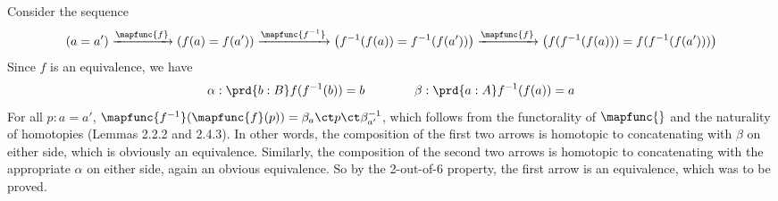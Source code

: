 Consider the sequence
\[
   \left(a = a'\right) \xrightarrow{\mapfunc{f}} 
   \left(f(a) = f(a')\right) \xrightarrow{\mapfunc{f^{-1}}} 
   \left(f^{-1}(f(a)) = f^{-1}(f(a'))\right) \xrightarrow{\mapfunc{f}} 
   \left(f(f^{-1}(f(a))) = f(f^{-1}(f(a')))\right)
\]
Since $f$ is an equivalence, we have
\[
  \alpha : \prd{b:B} f(f^{-1}(b)) = b
  \qquad\qquad
  \beta : \prd{a:A} f^{-1}(f(a)) = a
\]
For all $p : a = a'$, 
$\mapfunc{f^{-1}}(\mapfunc{f}(p)) = \beta_{a} \ct p \ct \beta_{a'}^{-1}$, 
which follows from the functorality of $\mapfunc{}$ and the naturality of
homotopies (Lemmas 2.2.2 and 2.4.3).  In other words, the composition of the
first two arrows is homotopic to concatenating with $\beta$ on either side,
which is obviously an equivalence.  Similarly, the composition of the second
two arrows is homotopic to concatenating with the appropriate $\alpha$ on
either side, again an obvious equivalence.  So by the 2-out-of-6 property, the
first arrow is an equivalence, which was to be proved.
